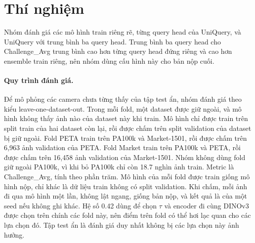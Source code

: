 \documentclass[10pt,twocolumn,letterpaper]{article}
\begin{document}
\section{Thí nghiệm}
\label{sec:exp}

Nhóm đánh giá các mô hình train riêng rẽ, từng query head của UniQuery, và UniQuery với trung bình ba query head. Trung bình ba query head cho Challenge\_Avg trung bình cao hơn từng query head đứng riêng và cao hơn ensemble train riêng, nên nhóm dùng cấu hình này cho bản nộp cuối.

\paragraph{Quy trình đánh giá.} Để mô phỏng các camera chưa từng thấy của tập test ẩn, nhóm đánh giá theo kiểu leave-one-dataset-out. Trong mỗi fold, một dataset được giữ ngoài, và mô hình không thấy ảnh nào của dataset này khi train. Mô hình chỉ được train trên split train của hai dataset còn lại, rồi được chấm trên split validation của dataset bị giữ ngoài. Fold PETA train trên PA100k và Market-1501, rồi được chấm trên 6,963 ảnh validation của PETA. Fold Market train trên PA100k và PETA, rồi được chấm trên 16,458 ảnh validation của Market-1501. Nhóm không dùng fold giữ ngoài PA100k, vì khi bỏ PA100k chỉ còn 18.7 nghìn ảnh train. Metric là Challenge\_Avg, tính theo phần trăm. Mô hình của mỗi fold được train giống mô hình nộp, chỉ khác là dữ liệu train không có split validation. Khi chấm, mỗi ảnh đi qua mô hình một lần, không lật ngang, giống bản nộp, và kết quả là của một seed nếu không ghi khác. Hệ số 0.42 dùng để chọn $\tau$ và encoder đi cùng DINOv3 được chọn trên chính các fold này, nên điểm trên fold có thể hơi lạc quan cho các lựa chọn đó. Tập test ẩn là đánh giá duy nhất không bị các lựa chọn này ảnh hưởng.
\end{document}

